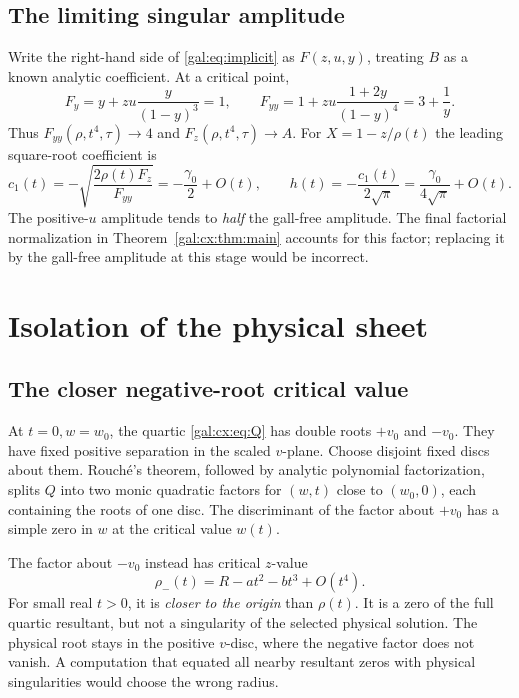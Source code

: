 \documentclass[11pt,letterpaper]{article}
\numberwithin{equation}{section}
\theoremstyle{definition}\newtheorem{definition}[theorem]{Definition}
\theoremstyle{remark}\newtheorem{remark}[theorem]{Remark}
\begin{document}
\subsection{The limiting singular amplitude}
Write the right-hand side of \eqref{gal:eq:implicit} as $F(z,u,y)$, treating $B$ as a known analytic coefficient. At a critical point,
\[
F_y=y+zu\frac{y}{(1-y)^3}=1,
\qquad F_{yy}=1+zu\frac{1+2y}{(1-y)^4}=3+\frac1y.
\]
Thus $F_{yy}(\rho,t^4,\tau)\to4$ and $F_z(\rho,t^4,\tau)\to A$. For $X=1-z/\rho(t)$ the leading square-root coefficient is
\begin{equation}\label{gal:cx:eq:amplitude}
c_1(t)=-\sqrt{\frac{2\rho(t)F_z}{F_{yy}}}
=-\frac{\gamma_0}{2}+O(t),\qquad
h(t)=-\frac{c_1(t)}{2\sqrt\pi}=\frac{\gamma_0}{4\sqrt\pi}+O(t).
\end{equation}
The positive-$u$ amplitude tends to \emph{half} the gall-free amplitude. The final factorial normalization in Theorem~\ref{gal:cx:thm:main} accounts for this factor; replacing it by the gall-free amplitude at this stage would be incorrect.

\section{Isolation of the physical sheet}
\subsection{The closer negative-root critical value}
At $t=0,w=w_0$, the quartic \eqref{gal:cx:eq:Q} has double roots $+v_0$ and $-v_0$. They have fixed positive separation in the scaled $v$-plane. Choose disjoint fixed discs about them. Rouch\'e's theorem, followed by analytic polynomial factorization, splits $Q$ into two monic quadratic factors for $(w,t)$ close to $(w_0,0)$, each containing the roots of one disc. The discriminant of the factor about $+v_0$ has a simple zero in $w$ at the critical value $w(t)$.

The factor about $-v_0$ instead has critical $z$-value
\begin{equation}\label{gal:cx:eq:negative}
\rho_-(t)=R-at^2-bt^3+O(t^4).
\end{equation}
For small real $t>0$, it is \emph{closer to the origin} than $\rho(t)$. It is a zero of the full quartic resultant, but not a singularity of the selected physical solution. The physical root stays in the positive $v$-disc, where the negative factor does not vanish. A computation that equated all nearby resultant zeros with physical singularities would choose the wrong radius.
\end{document}
